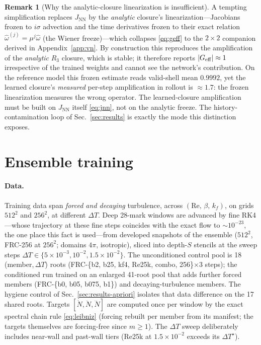 \documentclass[11pt]{article}
\theoremstyle{plain}
\theoremstyle{definition}
\newtheorem{remark}{Remark}
\newcommand{\Ndot}{\dot{N}}
\newcommand{\Nddot}{\ddot{N}}
\newcommand{\Ndddot}{\dddot{N}}
\newcommand{\DT}{\Delta T}
\newcommand{\DTs}{\Delta T^{\star}}
\begin{document}
\begin{remark}[Why the analytic-closure linearization is insufficient]
\label{rmk:frozen-insufficient}
A tempting simplification replaces $J_{\mathrm{NN}}$ by the \emph{analytic}
closure's linearization---Jacobians frozen to $i\sigma$ advection and the
time derivatives frozen to their exact relation $\hat\omega^{(j)}=\mu^{j}
\hat\omega$ (the Wiener freeze)---which collapses \eqref{eq:geff} to the
$2\times2$ companion derived in Appendix~\ref{app:vn}. By construction this
reproduces the amplification of the \emph{analytic} $R_3$ closure, which is
stable; it therefore reports $|G_{\rm eff}|\approx1$ irrespective of the
trained weights and cannot see the network's contribution. On the reference
model this frozen estimate reads valid-shell mean $0.9992$, yet the learned
closure's \emph{measured} per-step amplification in rollout is $\approx1.7$:
the frozen linearization measures the wrong operator. The learned-closure
amplification must be built on $J_{\mathrm{NN}}$ itself \eqref{eq:jnn}, not on
the analytic freeze. The history-contamination loop of Sec.~\ref{sec:results}
is exactly the mode this distinction exposes.
\end{remark}

\section{Ensemble training}
\label{sec:training}

\paragraph{Data.}
Training data span \emph{forced and decaying} turbulence, across
$(\mathrm{Re},\,\beta,\,k_f)$, on grids $512^2$ and $256^2$, at different
$\DT$. Deep 28-mark windows are advanced by fine RK4---whose trajectory at
these fine steps coincides with the exact flow to $\sim10^{-23}$, the one
place this fact is used---from developed snapshots of the ensemble
($512^2$, FRC-256 at $256^2$; domains $4\pi$, isotropic), sliced into
depth-$S$ stencils at the sweep steps
$\DT\in\{5\times10^{-3},10^{-2},1.5\times10^{-2}\}$. The unconditioned
control pool is 18 (member,\,$\DT$) roots
(FRC-\{b2, b25, kf4, Re25k, combo, 256\}$\times$3 steps); the conditioned run
trained on an enlarged 41-root pool that adds further forced members
(FRC-\{b0, b05, b075, b1\}) and decaying-turbulence members. The hygiene
control of Sec.~\ref{sec:results-apriori} isolates that data difference on
the 17 shared roots. Targets $[\Ndot,\Nddot,\Ndddot]$ are computed
once per window by the exact spectral chain rule \eqref{eq:leibniz}
(forcing rebuilt per member from its manifest; the targets themselves are
forcing-free since $m\ge1$). The $\DT$ sweep deliberately includes
near-wall and past-wall tiers (Re25k at $1.5\times10^{-2}$ exceeds its
$\DTs$).
\end{document}
